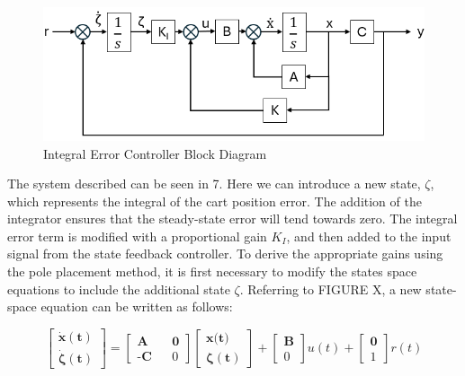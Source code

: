 \documentclass[titlepage]{article}
\begin{document}
\begin{figure}[h]
    \includegraphics[width=1\linewidth]{cory_controller.png}
    \caption{Integral Error Controller Block Diagram}
    \label{fig:enter-label}
\end{figure}

The system described can be seen in 7. Here we can introduce a new state, $\zeta$, which represents the integral of the cart position error. The addition of the integrator ensures that the steady-state error will tend towards zero. The integral error term is modified with a proportional gain $K_I$, and then added to the input signal from the state feedback controller. To derive the appropriate gains using the pole placement method, it is first necessary to modify the states space equations to include the additional state $\zeta$. Referring to FIGURE X, a new state-space equation can be written as follows:

\begin{equation}
    \begin{bmatrix}
        \mathbf{\dot x(t)} \\
        \boldsymbol{\dot \zeta(t)}
    \end{bmatrix}
    =
    \begin{bmatrix}
        \textbf{A} && \textbf{0} \\
        \textbf{-C} && 0
    \end{bmatrix}
    \begin{bmatrix}
        \textbf{x(t)} \\
        \boldsymbol{\zeta(t)}
    \end{bmatrix}
    +
    \begin{bmatrix}
        \textbf{B} \\ 0
    \end{bmatrix}
    u(t)
    +
    \begin{bmatrix}
        \textbf{0} \\ 1
    \end{bmatrix}
    r(t)
\end{equation}
\end{document}

